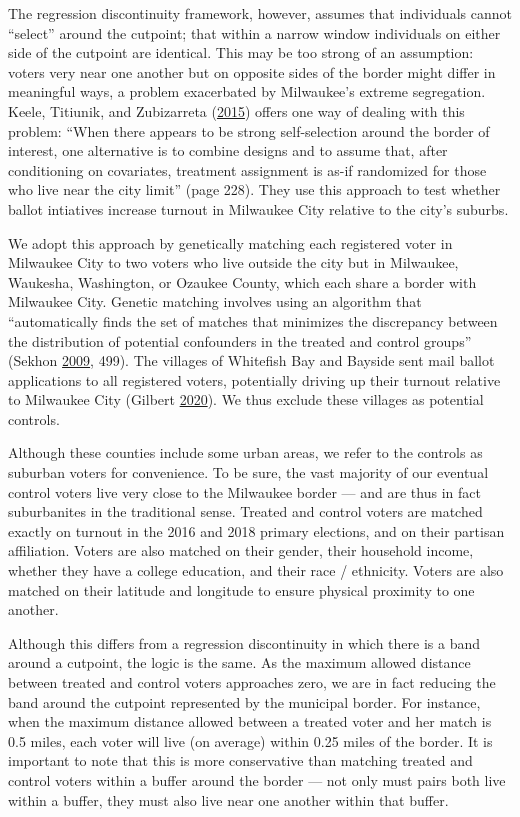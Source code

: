\documentclass[
  12pt,
]{article}
\begin{document}
The regression discontinuity framework, however, assumes that individuals cannot ``select'' around the cutpoint; that within a narrow window individuals on either side of the cutpoint are identical. This may be too strong of an assumption: voters very near one another but on opposite sides of the border might differ in meaningful ways, a problem exacerbated by Milwaukee's extreme segregation. Keele, Titiunik, and Zubizarreta (\protect\hyperlink{ref-Keele2015}{2015}) offers one way of dealing with this problem: ``When there appears to be strong self-selection around the border of interest, one alternative is to combine designs and to assume that, after conditioning on covariates, treatment assignment is as-if randomized for those who live near the city limit'' (page 228). They use this approach to test whether ballot intiatives increase turnout in Milwaukee City relative to the city's suburbs.

We adopt this approach by genetically matching each registered voter in Milwaukee City to two voters who live outside the city but in Milwaukee, Waukesha, Washington, or Ozaukee County, which each share a border with Milwaukee City. Genetic matching involves using an algorithm that ``automatically finds the set of matches that minimizes the discrepancy between the distribution of potential confounders in the treated and control groups'' (Sekhon \protect\hyperlink{ref-Sekhon2009}{2009}, 499). The villages of Whitefish Bay and Bayside sent mail ballot applications to all registered voters, potentially driving up their turnout relative to Milwaukee City (Gilbert \protect\hyperlink{ref-Gilbert2020}{2020}). We thus exclude these villages as potential controls.

Although these counties include some urban areas, we refer to the controls as suburban voters for convenience. To be sure, the vast majority of our eventual control voters live very close to the Milwaukee border --- and are thus in fact suburbanites in the traditional sense. Treated and control voters are matched exactly on turnout in the 2016 and 2018 primary elections, and on their partisan affiliation. Voters are also matched on their gender, their household income, whether they have a college education, and their race / ethnicity. Voters are also matched on their latitude and longitude to ensure physical proximity to one another.

Although this differs from a regression discontinuity in which there is a band around a cutpoint, the logic is the same. As the maximum allowed distance between treated and control voters approaches zero, we are in fact reducing the band around the cutpoint represented by the municipal border. For instance, when the maximum distance allowed between a treated voter and her match is 0.5 miles, each voter will live (on average) within 0.25 miles of the border. It is important to note that this is more conservative than matching treated and control voters within a buffer around the border --- not only must pairs both live within a buffer, they must also live near one another within that buffer.
\end{document}
